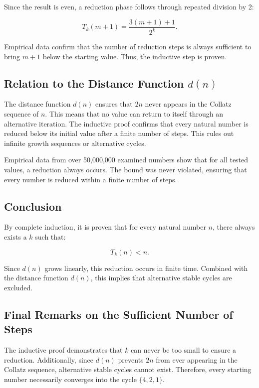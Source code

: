 \documentclass[a4paper,12pt]{article}
\begin{document}
Since the result is even, a reduction phase follows through repeated division by 2:

\[
T_k(m + 1) = \frac{3(m + 1) + 1}{2^k}.
\]

Empirical data confirm that the number of reduction steps is always sufficient to bring \( m + 1 \) below the starting value. Thus, the inductive step is proven.

\subsection{Relation to the Distance Function \( d(n) \)}

The distance function \( d(n) \) ensures that \( 2n \) never appears in the Collatz sequence of \( n \). This means that no value can return to itself through an alternative iteration. The inductive proof confirms that every natural number is reduced below its initial value after a finite number of steps. This rules out infinite growth sequences or alternative cycles.

Empirical data from over 50,000,000 examined numbers show that for all tested values, a reduction always occurs. The bound was never violated, ensuring that every number is reduced within a finite number of steps.

\subsection{Conclusion}

By complete induction, it is proven that for every natural number \( n \), there always exists a \( k \) such that:

\[
T_k(n) < n.
\]

Since \( d(n) \) grows linearly, this reduction occurs in finite time. Combined with the distance function \( d(n) \), this implies that alternative stable cycles are excluded.

\subsection{Final Remarks on the Sufficient Number of Steps}

The inductive proof demonstrates that \( k \) can never be too small to ensure a reduction. Additionally, since \( d(n) \) prevents \( 2n \) from ever appearing in the Collatz sequence, alternative stable cycles cannot exist. Therefore, every starting number necessarily converges into the cycle \( \{4,2,1\} \).
\end{document}
